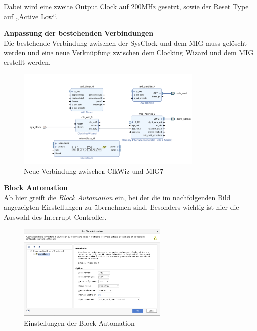 \vspace{10mm}

Dabei wird eine zweite Output Clock auf 200MHz gesetzt, sowie der Reset Type auf „Active Low“.\\

\newpage

\textbf{Anpassung der bestehenden Verbindungen}\\

Die bestehende Verbindung zwischen der SysClock und dem MIG muss gelöscht werden und eine neue Verknüpfung zwischen dem Clocking Wizard und dem MIG erstellt werden.\\

\begin{figure}[H]
\centering
\includegraphics[width=0.8\textwidth]{Hauptteil/schritt6.png}
\caption{Neue Verbindung zwischen ClkWiz und MIG7}\label{fig:mbschritt6}
\end{figure}

\vspace{10mm}

\textbf{Block Automation}\\

Ab hier greift die \emph{Block Automation} ein, bei der die im nachfolgenden Bild angezeigten Einstellungen zu übernehmen sind.
Besonders wichtig ist hier die Auswahl des Interrupt Controller.

\begin{figure}[H]
\centering
\includegraphics[width=0.65\textwidth]{Hauptteil/schritt7.png}
\caption{Einstellungen der Block Automation}\label{fig:mbschritt7}
\end{figure}


